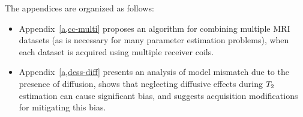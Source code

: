 The appendices are organized as follows:
\begin{itemize}
\item
	Appendix~\ref{a,cc-multi} proposes an algorithm
	for combining multiple MRI datasets
	(as is necessary for many parameter estimation problems),
	when each dataset is acquired 
	using multiple receiver coils.
\item
	Appendix~\ref{a,dess-diff} presents an analysis
	of model mismatch due to the presence of diffusion,
	shows that neglecting diffusive effects
	during $T_2$ estimation 
	can cause significant bias,
	and suggests acquisition modifications
	for mitigating this bias.
\end{itemize}

